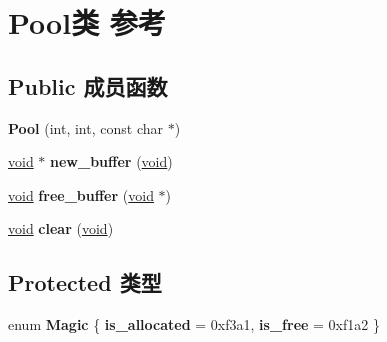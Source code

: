 \hypertarget{class_pool}{}\section{Pool类 参考}
\label{class_pool}
\subsection*{Public 成员函数}
\begin{DoxyCompactItemize}
\item 
\mbox{\label{class_pool_a63f64768bbbc278d5da0a5f622e57d71}} 
{\bfseries Pool} (int, int, const char $\ast$)
\item 
\mbox{\label{class_pool_a6821088999419668f5e1648bd019ed7a}} 
\hyperlink{interfacevoid}{void} $\ast$ {\bfseries new\+\_\+buffer} (\hyperlink{interfacevoid}{void})
\item 
\mbox{\label{class_pool_a3dc60dcb713e5af6622170ce6403a60c}} 
\hyperlink{interfacevoid}{void} {\bfseries free\+\_\+buffer} (\hyperlink{interfacevoid}{void} $\ast$)
\item 
\mbox{\label{class_pool_a12ce4e223f13fe707ae5e092fcf84d40}} 
\hyperlink{interfacevoid}{void} {\bfseries clear} (\hyperlink{interfacevoid}{void})
\end{DoxyCompactItemize}
\subsection*{Protected 类型}
\begin{DoxyCompactItemize}
\item 
\mbox{\label{class_pool_a404a46932a48f96525144f59f38e68ca}} 
enum {\bfseries Magic} \{ {\bfseries is\+\_\+allocated} = 0xf3a1, 
{\bfseries is\+\_\+free} = 0xf1a2
 \}
\end{DoxyCompactItemize}
